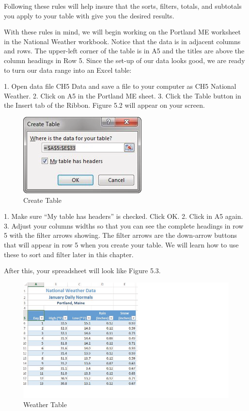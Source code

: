 Following these rules will help insure that the sorts, filters, totals, and subtotals you apply to your
table with give you the desired results.



With these rules in mind, we will begin working on the Portland ME worksheet in the National
Weather workbook. Notice that the data is in adjacent columns and rows. The upper-left corner of
the table is in A5 and the titles are above the column headings in Row 5. Since the set-up of our data
looks good, we are ready to turn our data range into an Excel table:

1. Open data file CH5 Data and save a file to your computer as CH5 National Weather.
2. Click on A5 in the Portland ME sheet.
3. Click the Table button in the Insert tab of the Ribbon.
Figure 5.2 will appear on your screen.


\begin{figure}[H]
	\centering
	\includegraphics[width=\maxwidth{.95\linewidth}]{gfx/ch05_fig02}
	\caption{Create Table}
	\label{05:fig02}
\end{figure}





1. Make sure “My table has headers” is checked. Click OK.
2. Click in A5 again.
3. Adjust your columns widths so that you can see the complete headings in row 5 with the filter
arrows showing. The filter arrows are the down-arrow buttons that will appear in row 5 when
you create your table. We will learn how to use these to sort and filter later in this chapter.

After this, your spreadsheet will look like Figure 5.3.


\begin{figure}[H]
	\centering
	\includegraphics[width=\maxwidth{.95\linewidth}]{gfx/ch05_fig03}
	\caption{Weather Table}
	\label{05:fig03}
\end{figure}






